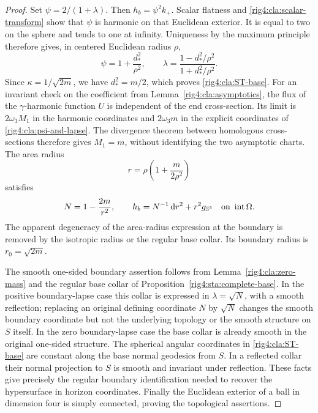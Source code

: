 \begin{proof}
Set $\psi=2/(1+\lambda)$.  Then $h_b=\psi^2k_+$.
Scalar flatness and \eqref{rig4:cla:scalar-transform} show that $\psi$
is harmonic on that Euclidean exterior.  It is equal to two on
the sphere and tends to one at infinity.  Uniqueness by the
maximum principle therefore gives, in centered Euclidean radius
$\rho$,
\begin{equation}\label{rig4:cla:psi-and-lapse}
 \psi=1+\frac{d_*^2}{\rho^2},\qquad
 \lambda=\frac{1-d_*^2/\rho^2}{1+d_*^2/\rho^2}.
\end{equation}
Since $\kappa=1/\sqrt{2m}$, we have $d_*^2=m/2$,
which proves \eqref{rig4:cla:ST-base}.  For an invariant check on the
coefficient from Lemma~\ref{rig4:cla:asymptotics}, the flux of the
$\gamma$-harmonic function $U$ is independent of the end cross-section.
Its limit is $2\omega_3M_1$ in the harmonic coordinates and
$2\omega_3m$ in the explicit coordinates of \eqref{rig4:cla:psi-and-lapse}.
The divergence theorem between homologous cross-sections therefore
gives $M_1=m$, without identifying the two asymptotic charts.
The area radius
\[
 r=\rho\left(1+\frac{m}{2\rho^2}\right)
\]
satisfies
\begin{equation}\label{rig4:cla:area-radius-base}
 N=1-\frac{2m}{r^2},\qquad
 h_b=N^{-1}\,\mathrm d r^2+r^2g_{\mathbb S^3}
       \quad\hbox{on }\operatorname{int}\Omega.
\end{equation}
The apparent degeneracy of the area-radius expression at the
boundary is removed by the isotropic radius or the regular base
collar.  Its boundary radius is $r_0=\sqrt{2m}$.

The smooth one-sided boundary assertion follows from
Lemma~\ref{rig4:cla:zero-mass} and the regular base collar of
Proposition~\ref{rig4:sta:complete-base}.  In the positive boundary-lapse
case this collar is expressed in $\lambda=\sqrt N$, with a smooth
reflection; replacing an original defining coordinate $N$ by
$\sqrt N$ changes the smooth boundary coordinate but not the
underlying topology or the smooth structure on $S$ itself.
In the zero boundary-lapse case the base collar is already smooth
in the original one-sided structure.  The spherical angular
coordinates in \eqref{rig4:cla:ST-base} are constant along the base
normal geodesics from $S$.  In a reflected collar their normal
projection to $S$ is smooth and invariant under reflection.
These facts give precisely the regular boundary identification
needed to recover the hypersurface in horizon coordinates.
Finally the Euclidean exterior of a ball in dimension four is
simply connected, proving the topological assertions.
\end{proof}
